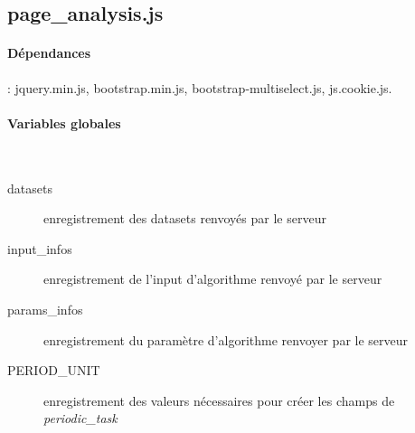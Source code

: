 \documentclass[a4paper]{report}
\begin{document}
\subsection{page\_analysis.js}
\paragraph{Dépendances} : jquery.min.js, bootstrap.min.js, bootstrap-multiselect.js, js.cookie.js.

\paragraph{Variables globales}~\\
\begin{description}
	\item[datasets] enregistrement des datasets renvoyés par le serveur
	\item [input\_infos] enregistrement de l'input d'algorithme renvoyé par le serveur
	\item [params\_infos] enregistrement du paramètre d'algorithme renvoyer par le serveur
	\item [PERIOD\_UNIT] enregistrement des valeurs nécessaires pour créer les champs de \emph{periodic\_task}
\end{description}
\end{document}
